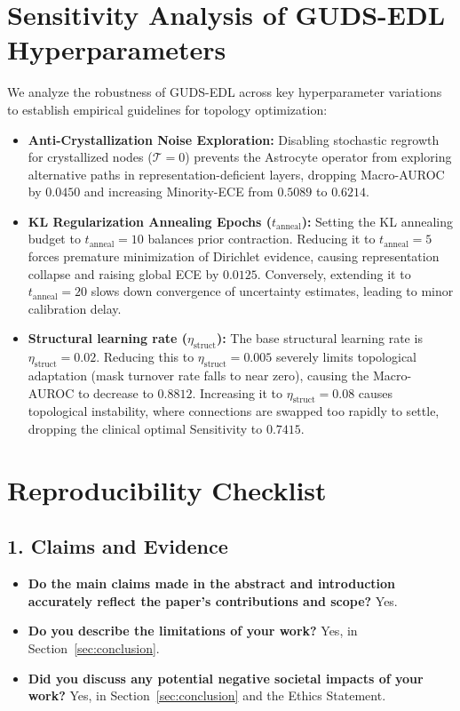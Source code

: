 \documentclass[letterpaper]{article} %
\begin{document}
\section{Sensitivity Analysis of GUDS-EDL Hyperparameters}
We analyze the robustness of GUDS-EDL across key hyperparameter variations to establish empirical guidelines for topology optimization:
\begin{itemize}
    \item \textbf{Anti-Crystallization Noise Exploration:} Disabling stochastic regrowth for crystallized nodes ($\mathcal{T} = 0$) prevents the Astrocyte operator from exploring alternative paths in representation-deficient layers, dropping Macro-AUROC by $0.0450$ and increasing Minority-ECE from $0.5089$ to $0.6214$.
    \item \textbf{KL Regularization Annealing Epochs ($t_{\text{anneal}}$):} Setting the KL annealing budget to $t_{\text{anneal}} = 10$ balances prior contraction. Reducing it to $t_{\text{anneal}} = 5$ forces premature minimization of Dirichlet evidence, causing representation collapse and raising global ECE by $0.0125$. Conversely, extending it to $t_{\text{anneal}} = 20$ slows down convergence of uncertainty estimates, leading to minor calibration delay.
    \item \textbf{Structural learning rate ($\eta_{\text{struct}}$):} The base structural learning rate is $\eta_{\text{struct}} = 0.02$. Reducing this to $\eta_{\text{struct}} = 0.005$ severely limits topological adaptation (mask turnover rate falls to near zero), causing the Macro-AUROC to decrease to $0.8812$. Increasing it to $\eta_{\text{struct}} = 0.08$ causes topological instability, where connections are swapped too rapidly to settle, dropping the clinical optimal Sensitivity to $0.7415$.
\end{itemize}

\section*{Reproducibility Checklist}

\subsection*{1. Claims and Evidence}
\begin{itemize}
    \item \textbf{Do the main claims made in the abstract and introduction accurately reflect the paper's contributions and scope?} Yes.
    \item \textbf{Do you describe the limitations of your work?} Yes, in Section~\ref{sec:conclusion}.
    \item \textbf{Did you discuss any potential negative societal impacts of your work?} Yes, in Section~\ref{sec:conclusion} and the Ethics Statement.
\end{itemize}
\end{document}
